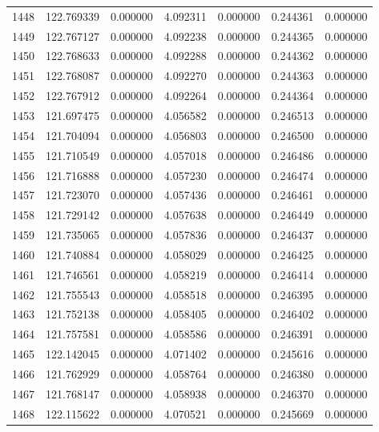 \begin{tabular}{rrrrrrr}
1448 & 122.769339 &    0.000000 &  4.092311 &    0.000000 &    0.244361 &  0.000000 \\
1449 & 122.767127 &    0.000000 &  4.092238 &    0.000000 &    0.244365 &  0.000000 \\
1450 & 122.768633 &    0.000000 &  4.092288 &    0.000000 &    0.244362 &  0.000000 \\
1451 & 122.768087 &    0.000000 &  4.092270 &    0.000000 &    0.244363 &  0.000000 \\
1452 & 122.767912 &    0.000000 &  4.092264 &    0.000000 &    0.244364 &  0.000000 \\
1453 & 121.697475 &    0.000000 &  4.056582 &    0.000000 &    0.246513 &  0.000000 \\
1454 & 121.704094 &    0.000000 &  4.056803 &    0.000000 &    0.246500 &  0.000000 \\
1455 & 121.710549 &    0.000000 &  4.057018 &    0.000000 &    0.246486 &  0.000000 \\
1456 & 121.716888 &    0.000000 &  4.057230 &    0.000000 &    0.246474 &  0.000000 \\
1457 & 121.723070 &    0.000000 &  4.057436 &    0.000000 &    0.246461 &  0.000000 \\
1458 & 121.729142 &    0.000000 &  4.057638 &    0.000000 &    0.246449 &  0.000000 \\
1459 & 121.735065 &    0.000000 &  4.057836 &    0.000000 &    0.246437 &  0.000000 \\
1460 & 121.740884 &    0.000000 &  4.058029 &    0.000000 &    0.246425 &  0.000000 \\
1461 & 121.746561 &    0.000000 &  4.058219 &    0.000000 &    0.246414 &  0.000000 \\
1462 & 121.755543 &    0.000000 &  4.058518 &    0.000000 &    0.246395 &  0.000000 \\
1463 & 121.752138 &    0.000000 &  4.058405 &    0.000000 &    0.246402 &  0.000000 \\
1464 & 121.757581 &    0.000000 &  4.058586 &    0.000000 &    0.246391 &  0.000000 \\
1465 & 122.142045 &    0.000000 &  4.071402 &    0.000000 &    0.245616 &  0.000000 \\
1466 & 121.762929 &    0.000000 &  4.058764 &    0.000000 &    0.246380 &  0.000000 \\
1467 & 121.768147 &    0.000000 &  4.058938 &    0.000000 &    0.246370 &  0.000000 \\
1468 & 122.115622 &    0.000000 &  4.070521 &    0.000000 &    0.245669 &  0.000000 \\

\end{tabular}
